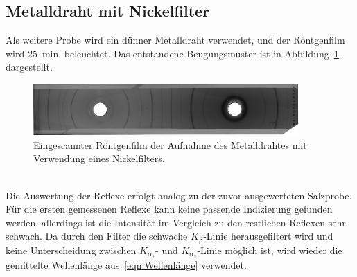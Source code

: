 \documentclass[a4paper,twoside,final]{article}
\begin{document}
\subsection{Metalldraht mit Nickelfilter}
Als weitere Probe wird ein dünner Metalldraht verwendet, und der Röntgenfilm wird $\SI{25}{\min}$ beleuchtet. Das entstandene Beugungsmuster ist in Abbildung~\ref{fig:Metalldraht} dargestellt.
\begin{figure}[htp]
    \centering
        \includegraphics[width=0.9\textwidth]{Abbildungen/Roentgenfilm_Metalldraht_Filter.jpg}
    \caption{Eingescannter Röntgenfilm der Aufnahme des Metalldrahtes mit Verwendung eines Nickelfilters.}
    \label{fig:Metalldraht}
\end{figure}\\
Die Auswertung der Reflexe erfolgt analog zu der zuvor ausgewerteten Salzprobe. Für die ersten gemessenen Reflexe kann keine passende Indizierung gefunden werden, allerdings ist die Intensität im Vergleich zu den restlichen Reflexen sehr schwach. Da durch den Filter die schwache $K_\beta$-Linie herausgefiltert wird und keine Unterscheidung zwischen $K_{\alpha_1}$- und $K_{\alpha_2}$-Linie möglich ist, wird wieder die gemittelte Wellenlänge aus~\eqref{eqn:Wellenlänge} verwendet.
\end{document}
